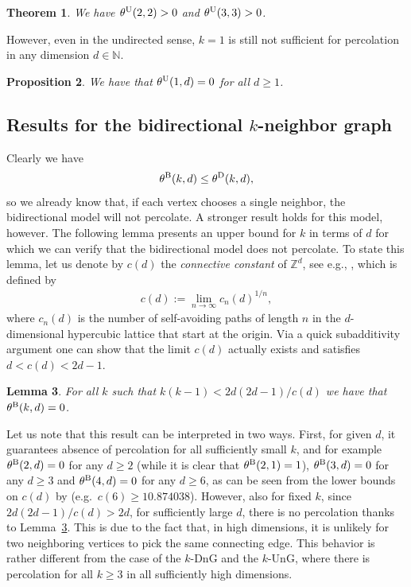 \documentclass[a4paper, oneside, 11pt]{amsart}
\newcommand{\N}{\mathbb{N}}
\newtheorem{theorem}{Theorem}[section]
\newtheorem{lemma}[theorem]{Lemma}
\newtheorem{prop}[theorem]{Proposition}
\theoremstyle{definition}
\newcommand{\1}{\mathbbm{1}}
\newcommand{\0}{\mathbf{o}}
\newcommand{\Z}{\mathbb{Z}}
\numberwithin{equation}{section}
\begin{document}
\begin{theorem}\label{theorem-U22}
  We have $\theta^{\rm U}(2,2)>0$ and $\theta^{\rm U}(3,3)>0$.  
\end{theorem}

However, even in the undirected sense, $k=1$ is still not sufficient for percolation in any dimension $d \in \N$. 
\begin{prop}\label{prop-U1}
    We have that $\theta^{\rm U}(1,d)=0$ for all $d \geq 1$.
\end{prop}

\subsection{Results for the bidirectional $k$-neighbor graph}\label{sec:B}
Clearly we have 
\begin{align*}
    \theta^{\rm B}(k,d) \leq \theta^{\rm D}(k,d), 
\end{align*}
so we already know that, if each vertex chooses a single neighbor, the bidirectional model will not percolate. A stronger result holds for this model, however. The following lemma presents an upper bound for $k$ in terms of $d$ for which we can verify that the bidirectional model does not percolate. To state this lemma, let us denote by $c(d)$ the \textit{connective constant} of $\Z^d$, see e.g., \cite{grimmett2006random}, which is defined by 
\begin{align*}
    c(d) := \lim_{n \to \infty}c_n(d)^{1/n},
\end{align*}
where $c_n(d)$ is the number of self-avoiding paths of length $n$ in the $d$-dimensional hypercubic lattice that start at the origin. Via a quick subadditivity argument one can show that the limit $c(d)$ actually exists and satisfies $d < c(d) < 2d -1$. 

\begin{lemma}\label{lemma-Bnoperc}
For all $k$ such that $k(k-1)<2d(2d-1)/c(d)$ we have that $\theta^{\rm B}(k,d)=0$.
\end{lemma}
Let us note that this result can be interpreted in two ways. First, for given $d$, it guarantees absence of percolation for all sufficiently small $k$, and for example $\theta^{\rm B}(2,d)=0$ for any $d\geq 2$ (while it is clear that $\theta^{\rm B}(2,1)=1$), $\theta^{\rm B}(3,d)=0$ for any $d \geq 3$ and $\theta^{\rm B}(4,d)=0$ for any $d \geq 6$, as can be seen from the lower bounds on $c(d)$ by \cite[Table 1]{HSS} (e.g.\ $c(6)\geq 10.874038$). However, also for fixed $k$, since $2d(2d-1)/c(d)>2d$, for sufficiently large $d$, there is no percolation thanks to Lemma~\ref{lemma-Bnoperc}. This is due to the fact that, in high dimensions, it is unlikely for two neighboring vertices to pick the same connecting edge. This behavior is rather different from the case of the $k$-DnG and the $k$-UnG, where there is percolation for all $k \geq 3$ in all sufficiently high dimensions.
\end{document}
